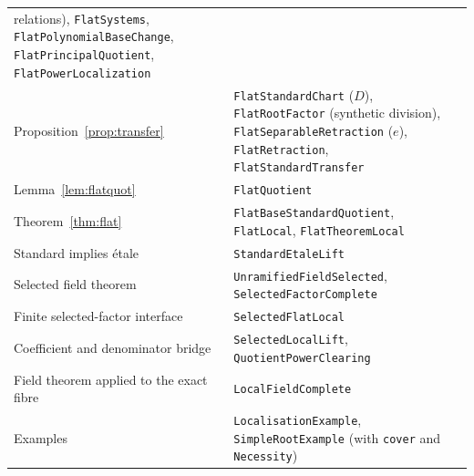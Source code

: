 \documentclass[11pt]{amsart}
\numberwithin{equation}{section}
\theoremstyle{definition}
\theoremstyle{remark}
\newcommand{\code}[1]{\texttt{#1}}
\begin{document}
{\begin{longtable}{>{\raggedright\arraybackslash}p{}>{\raggedright\arraybackslash}p{}}
 relations), \code{FlatSystems}, \code{FlatPolynomialBaseChange},
 \code{FlatPrincipalQuotient}, \code{FlatPowerLocalization}\\
Proposition~\ref{prop:transfer} & \code{FlatStandardChart} ($D$),
 \code{FlatRootFactor} (synthetic division),
 \code{FlatSeparableRetraction} ($e$), \code{FlatRetraction},
 \code{FlatStandardTransfer}\\
Lemma~\ref{lem:flatquot} & \code{FlatQuotient}\\
Theorem~\ref{thm:flat} & \code{FlatBaseStandardQuotient},
 \code{FlatLocal}, \code{FlatTheoremLocal}\\
Standard implies \'etale & \code{StandardEtaleLift}\\
Selected field theorem & \code{UnramifiedFieldSelected},
 \code{SelectedFactorComplete}\\
Finite selected-factor interface & \code{SelectedFlatLocal}\\
Coefficient and denominator bridge & \code{SelectedLocalLift},
 \code{QuotientPowerClearing}\\
Field theorem applied to the exact fibre & \code{LocalFieldComplete}\\
Examples & \code{LocalisationExample}, \code{SimpleRootExample}
 (with \code{cover} and \code{Necessity})\\
\bottomrule
\end{longtable}}
\end{document}
